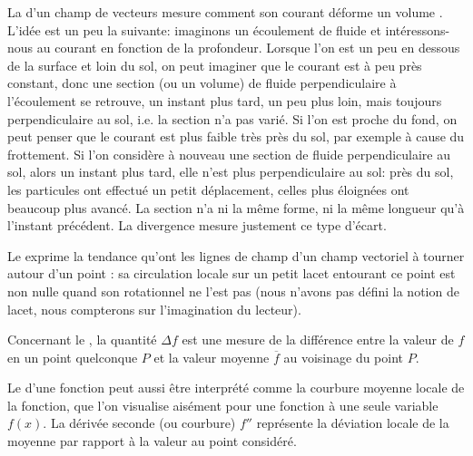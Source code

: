 La  d'un champ de vecteurs mesure comment son courant déforme
un volume .
{\small L'idée est un peu la suivante: imaginons un écoulement de fluide et intéressons-nous au
courant en fonction de la profondeur. Lorsque l'on est un peu en dessous de la surface et loin
du sol, on peut imaginer que le courant est à peu près constant, donc une section (ou un volume)
de fluide perpendiculaire à l'écoulement se retrouve, un instant plus tard, un peu plus
loin, mais toujours perpendiculaire au sol, i.e. la section n'a pas varié.
Si l'on est proche du fond, on peut penser que le courant est plus faible très près du
sol, par exemple à cause du frottement. Si l'on considère à nouveau une section
de fluide perpendiculaire au sol, alors un instant plus tard, elle n'est plus perpendiculaire
au sol: près du sol, les particules ont effectué un petit déplacement, celles plus éloignées ont
beaucoup plus avancé. La section n'a ni la même forme, ni la même longueur
qu'à l'instant précédent. La divergence mesure justement ce type d'écart.}


Le  exprime la tendance qu'ont les lignes de champ d'un champ vectoriel
à tourner autour d'un point : sa circulation locale sur un petit lacet entourant ce point est non nulle
quand son rotationnel ne l'est pas (nous n'avons pas défini la notion de lacet, nous compterons
sur l'imagination du lecteur). 

\ifVersionDuDocEstVincent\medskip\fi
Concernant le , la quantité $\Delta f$ est une mesure de la
différence entre la valeur de $f$ en un point quelconque $P$ et la valeur moyenne $\overline{f}$
au voisinage du point $P$.

Le  d'une fonction peut aussi être interprété comme la
courbure moyenne locale de la fonction, que l'on visualise aisément pour une fonction à
une seule variable $f(x)$.
La dérivée seconde (ou courbure) $f''$ représente la déviation locale de la moyenne par
rapport à la valeur au point considéré.


